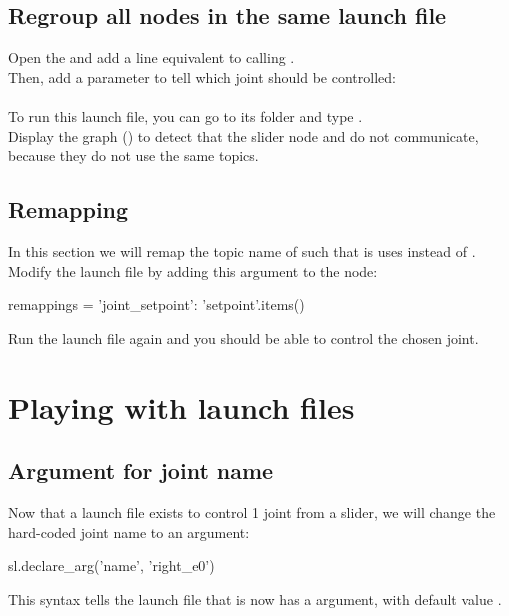 \documentclass{ecnreport}
\begin{document}
\subsection{Regroup all nodes in the same launch file}

Open the  and add a line equivalent to calling .\\
Then, add a parameter to tell which joint should be controlled:\\\\

To run this launch file, you can go to its folder and type .\\
Display the graph () to detect that the slider node and  do not communicate, because they do not use the same topics.

\subsection{Remapping}

In this section we will remap the topic name of  such that is uses  instead of .\\

Modify the launch file by adding this argument to the  node:

\begin{pythoncodelarge}
remappings = {'joint_setpoint': 'setpoint'}.items()
\end{pythoncodelarge}
Run the launch file again and you should be able to control the chosen joint.

\section{Playing with launch files}

\subsection{Argument for joint name}

Now that a launch file exists to control 1 joint from a slider, we will change the hard-coded joint name to an argument:
\begin{pythoncodelarge}
sl.declare_arg('name', 'right_e0')
\end{pythoncodelarge}
This syntax tells the launch file that is now has a  argument, with default value .\\
\end{document}
